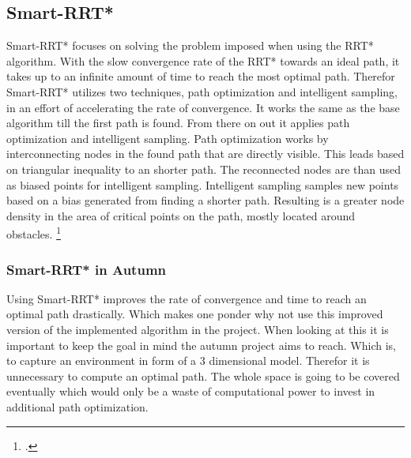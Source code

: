 \subsection{Smart-RRT*}

Smart-RRT* focuses on solving the problem imposed when using the RRT* algorithm. With the slow convergence rate of the RRT* towards an ideal path, it takes up to an infinite amount of time to reach the most optimal path. Therefor Smart-RRT* utilizes two techniques, path optimization and intelligent sampling, in an effort of accelerating the rate of convergence. 
It works the same as the base algorithm till the first path is found. From there on out it applies path optimization and intelligent sampling. Path optimization works by interconnecting nodes in the found path that are directly visible. This leads based on triangular inequality to an shorter path. The reconnected nodes are than used as biased points for intelligent sampling. Intelligent sampling samples new points based on a bias generated from finding a shorter path. Resulting is a greater node density in the area of critical points on the path, mostly located around obstacles. 
\footcite{Islam2012}

\subsubsection{Smart-RRT* in Autumn}
Using Smart-RRT* improves the rate of convergence and time to reach an optimal path drastically. Which makes one ponder why not use this improved version of the implemented algorithm in the project. When looking at this it is important to keep the goal in mind the autumn project aims to reach. Which is, to capture an environment in form of a 3 dimensional model. Therefor it is unnecessary to compute an optimal path. The whole space is going to be covered eventually which would only be a waste of computational power to invest in additional path optimization. 